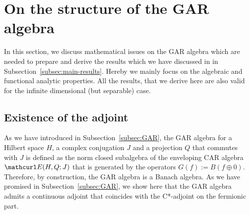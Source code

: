 \documentclass[pra,twoside,amsmath,amsfonts,amssymb,superscriptaddress,showpacs]{revtex4}
\def\9#1{{\mathcurl #1}}
\newcommand{\ENV}[3]{\9E(#1,#3;#2)}
\begin{document}
\section{On the structure of the GAR algebra}
\label{sec:math_struc}
In this section, we discuss mathematical issues on the GAR algebra which are needed to prepare
and derive the results which we have discussed in in Subsection~\ref{subsec:main-results}. Hereby
we mainly focus on the algebraic and functional analytic properties. All the results, that we
derive here are also valid for the infinite dimensional (but separable) case. 

\subsection{Existence of the adjoint}
\label{subsec:adjoint}
As we have introduced in Subsection~\ref{subsec:GAR}, the GAR algebra for a Hilbert space $H$, a
complex conjugation $J$ and a projection $Q$ that commutes with $J$ is defined as the norm closed
subalgebra of the enveloping CAR algebra $\ENV{H}{J}{Q}$ that is generated by the operators
$G(f):=B(f\oplus 0)$. Therefore, by construction, the GAR algebra is a Banach algebra. As we have
promised in Subsection~\ref{subsec:GAR}, we show here that the  GAR algebra admits a continuous
adjoint that coincides with the C*-adjoint on the fermionic part. 
 
\end{document}
